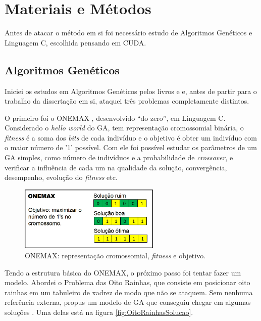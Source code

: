 \chapter{Materiais e Métodos\label{cap:metodologia}}

Antes de atacar o método em si foi necessário estudo de Algoritmos Genéticos e Linguagem C, escolhida pensando em CUDA.

\section{Algoritmos Genéticos}
	
	Iniciei os estudos em Algoritmos Genéticos pelos livros \cite{Mitchell98} e \cite{Linden2008} e, antes de partir para o trabalho da dissertação em si, ataquei três problemas completamente distintos.
	
	O primeiro foi o ONEMAX \cite{onemaxNaGPU}, desenvolvido ``do zero'', em Linguagem C. Considerado o \emph{hello world} do GA, tem representação cromossomial binária, o \emph{fitness} é a soma dos \emph{bits} de cada indivíduo e o objetivo é obter um indivíduo com o maior número de '1' possível. Com ele foi possível estudar os parâmetros de um GA simples, como número de indivíduos e a probabilidade de \emph{crossover}, e verificar a influência de cada um na qualidade da solução, convergência, desempenho, evolução do \emph{fitness} etc.
	
	\begin{figure}[htbp]
		\centering
			\includegraphics[width=0.60\textwidth]{figs/resultados/onemax/onemax_objetivo.png}
		\caption{ONEMAX: representação cromossomial, \emph{fitness} e objetivo.}
		\label{fig:onemax_objetivo_metodologia}
	\end{figure}
	
	Tendo a estrutura básica do ONEMAX, o próximo passo foi tentar fazer um modelo. Abordei o Problema das Oito Rainhas, que consiste em posicionar oito rainhas em um tabuleiro de xadrez de modo que não se ataquem. Sem nenhuma referência externa, propus um modelo de GA que conseguiu chegar em algumas soluções \cite{qualificacao_adriano}. Uma delas está na figura \ref{fig:OitoRainhasSolucao}.
	

